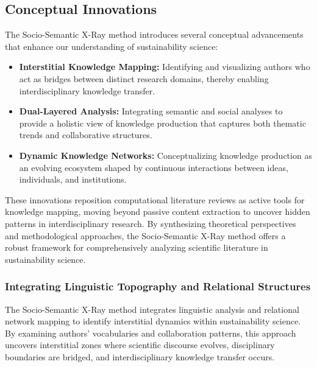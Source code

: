 \documentclass[12pt]{article}
\begin{document}
\subsection{Conceptual Innovations}
The Socio-Semantic X-Ray method introduces several conceptual advancements that enhance our understanding of sustainability science:
\begin{itemize}
    \item \textbf{Interstitial Knowledge Mapping:} Identifying and visualizing authors who act as bridges between distinct research domains, thereby enabling interdisciplinary knowledge transfer.
    \item \textbf{Dual-Layered Analysis:} Integrating semantic and social analyses to provide a holistic view of knowledge production that captures both thematic trends and collaborative structures.
    \item \textbf{Dynamic Knowledge Networks:} Conceptualizing knowledge production as an evolving ecosystem shaped by continuous interactions between ideas, individuals, and institutions.
\end{itemize}

These innovations reposition computational literature reviews as active tools for knowledge mapping, moving beyond passive content extraction to uncover hidden patterns in interdisciplinary research\cite{antons_computational_2023}. By synthesizing theoretical perspectives and methodological approaches, the Socio-Semantic X-Ray method offers a robust framework for comprehensively analyzing scientific literature in sustainability science.


\subsubsection{Integrating Linguistic Topography and Relational Structures}

The Socio-Semantic X-Ray method integrates linguistic analysis and relational network mapping to identify interstitial dynamics within sustainability science. By examining authors' vocabularies and collaboration patterns, this approach uncovers interstitial zones where scientific discourse evolves, disciplinary boundaries are bridged, and interdisciplinary knowledge transfer occurs. 
\end{document}
